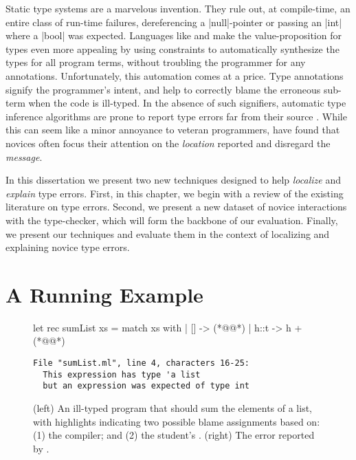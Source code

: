 Static type systems are a marvelous invention.
%
They rule out, at compile-time, an entire class of run-time failures,
\eg dereferencing a |null|-pointer or passing an |int| where a |bool|
was expected.
%
Languages like \ocaml and \haskell make
the value-proposition for types even more
appealing by using constraints to automatically
synthesize the types for all program terms,
without troubling the programmer for any
annotations.
%
Unfortunately, this automation comes at a price.
%
Type annotations signify the programmer's intent, and help to correctly
blame the erroneous sub-term when the code is ill-typed.
%
In the absence of such signifiers, automatic type inference algorithms
are prone to report type errors far from their source
\citep{Wand1986-nw}.
%
While this can seem like a minor annoyance to veteran programmers,
\citet{Joosten1993-yx} have found that novices often focus their
attention on the \emph{location} reported and disregard the
\emph{message}.

In this dissertation we present two new techniques designed to help
\emph{localize} and \emph{explain} type errors.
%
First, in this chapter, we begin with a review of the existing
literature on type errors.
%
Second, we present a new dataset of novice interactions with the \ocaml
type-checker, which will form the backbone of our evaluation.
%
Finally, we present our techniques and evaluate them in the context of
localizing and explaining novice type errors.

\section{A Running Example}
\label{sec:intro:sumList}

\begin{figure}[t!]
\small
\begin{minipage}{0.45\linewidth}
\begin{ecode}
let rec sumList xs =
  match xs with
  | []   -> (*@\hlSherrloc{[]}@*)
  | h::t -> h + (*@@*)
\end{ecode}
\end{minipage}
\begin{minipage}{0.49\linewidth}
\begin{verbatim}
File "sumList.ml", line 4, characters 16-25:
  This expression has type 'a list
  but an expression was expected of type int

\end{verbatim}
\end{minipage}
\caption{(left) An ill-typed \ocaml program that should sum the elements of a
  list, with highlights indicating two possible blame assignments based on:
  (1) the \hlTree{\ocaml} compiler; and
  (2) the student's .
  (right) The error reported by \ocaml.}
\label{fig:intro:sumList}
\end{figure}


